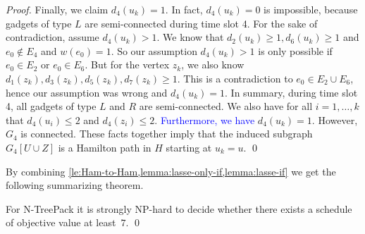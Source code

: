 \documentclass[runningheads]{llncs}
\newcommand{\xxxNTP}{{\sc N-TreePack}}
\newcommand{\lasse}[1]{\textcolor{blue}{#1}}
\begin{document}
\begin{proof}
Finally, we claim $d_4(u_k) = 1$. In fact, $d_4(u_k) = 0$ is impossible, because gadgets of type $L$ are semi-connected during time slot 4. For the sake of contradiction, assume $d_4(u_k) > 1$. We know that $d_2(u_k) \geq 1, d_6(u_k) \geq 1$ and $e_0 \not\in E_4$ and $w(e_0) = 1$. So our assumption $d_4(u_k) > 1$ is only possible if $e_0 \in E_2$ or $e_0 \in E_6$. But for the vertex $z_k$, we also know $d_1(z_k), d_3(z_k), d_5(z_k), d_7(z_k) \geq 1$. This is a contradiction to $e_0 \in E_2 \cup E_6$, hence our assumption was wrong and $d_4(u_k) = 1$.
In summary, during time slot 4, all gadgets of type $L$ and $R$ are semi-connected. We also have for all $i=1,\dots,k$ that $d_4(u_i) \leq 2$ and $d_4(z_i) \leq 2$. \lasse{Furthermore, we have} $d_4(u_k) = 1$. However, $G_4$ is connected. These facts together imply that the induced subgraph $G_4[U \cup Z]$ is a Hamilton path in $H$ starting at $u_k = u$.
\qed
\end{proof}

By combining \cref{le:Ham-to-Ham,lemma:lasse-only-if,lemma:lasse-if} we get
the following summarizing theorem.
\begin{theorem}
\label{th:value=7}
For {\xxxNTP} it is strongly NP-hard to decide whether there exists a schedule
of objective value at least~$7$.
\qed
\end{theorem}
\end{document}
